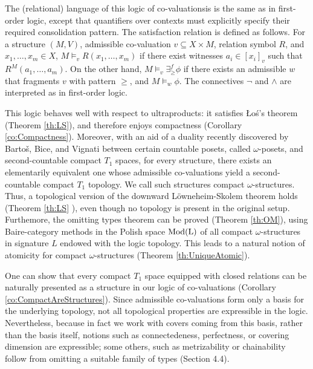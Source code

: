\documentclass[12pt]{amsart}
\theoremstyle{plain}
\newcommand \Mod{\rm{Mod}}
\newcommand \fr{\scriptscriptstyle{f}}
\begin{document}
The (relational) language of this logic of co-valuationsis is the same as in first-order logic, except that quantifiers over contexts must explicitly specify their required consolidation pattern. The satisfaction relation is defined as follows. For a structure $(M,V)$, admissible co-valuation $v \subseteq X \times M$, relation symbol $R$, and $x_1, \ldots, x_m \in X$, $M \models_v R(x_1, \ldots, x_m)$ if there exist witnesses $a_i \in [x_i]_v$ such that $R^M(a_1, \ldots, a_m)$. On the other hand, $M \models_v \exists^{\fr}_\geq \phi$ if there exists an admissible $w$ that fragments $v$ with pattern $\geq$, and $M \models_w \phi$. The connectives $\neg$ and $\wedge$ are interpreted as in first-order logic.

This logic behaves well with respect to ultraproducts: it satisfies \L{}o\'s's theorem (Theorem \ref{th:LS}), and therefore enjoys compactness (Corollary \ref{co:Compactness}). Moreover, with an aid of a duality recently discovered by Bartoš, Bice, and Vignati \cite{BaBiVi} between certain countable posets, called $\omega$-posets, and second-countable compact $T_1$ spaces, for every structure, there exists an elementarily equivalent one whose admissible co-valuations yield a second-countable  compact $T_1$ topology. We call such structures compact $\omega$-structures. Thus, a topological version of the downward L\" owneheim-Skolem theorem holds (Theorem \ref{th:LS} ), even though no topology is present in the original setup. Furthemore, the omitting types theorem can be proved (Theorem \ref{th:OM}), using Baire-category methods in the Polish space $\Mod(L)$ of all compact $\omega$-structures in signature $L$ endowed with the logic topology. This leads to a natural notion of atomicity for compact $\omega$-structures (Theorem \ref{th:UniqueAtomic}).
 
One can show that every compact $T_1$ space equipped with closed relations can be naturally presented as a structure in our logic of co-valuations (Corollary \ref{co:CompactAreStructures}). Since admissible co-valuations form only a basis for the underlying topology, not all topological properties are expressible in the logic. Nevertheless, because in fact we work with covers coming from this basis, rather than the basis itself, notions such as connectedeness, perfectness, or covering dimension are expressible; some others, such as metrizability or chainability follow from omitting a suitable family of types (Section 4.4).  
\end{document}
